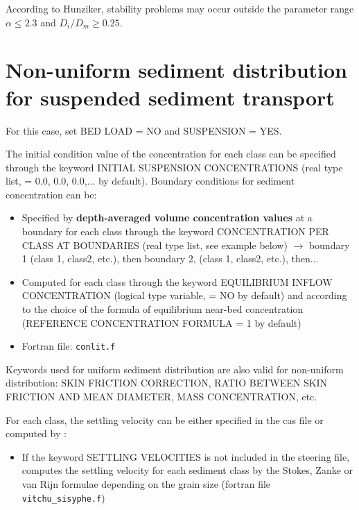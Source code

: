 According to Hunziker, stability problems may occur outside the parameter range $\alpha \leq 2.3$ and $D_i/D_m \geq 0.25$.


\section{Non-uniform sediment distribution for suspended sediment transport}
For this case, set {\ttfamily BED LOAD = NO} and {\ttfamily SUSPENSION = YES}.

The initial condition value of the concentration for each class can be specified through the keyword {\ttfamily INITIAL SUSPENSION CONCENTRATIONS} (real type list, {\ttfamily = 0.0, 0.0, 0.0,...} by default). Boundary conditions for sediment concentration can be:
\begin{itemize}
\item Specified by \textbf{depth-averaged volume concentration values} at a boundary for each class through the keyword {\ttfamily CONCENTRATION PER CLASS AT BOUNDARIES} (real type list, see example below) $\rightarrow$ boundary 1 (class 1, class2, etc.), then boundary 2, (class 1, class2, etc.), then...
\item Computed for each class through the keyword {\ttfamily EQUILIBRIUM INFLOW CONCENTRATION} (logical type variable, {\ttfamily = NO} by default) and according to the choice of the formula of equilibrium near-bed concentration ({\ttfamily REFERENCE CONCENTRATION FORMULA = 1} by default) 
\item Fortran file: \texttt{conlit.f}
\end{itemize}

Keywords used for uniform sediment distribution are also valid for non-uniform distribution: {\ttfamily SKIN FRICTION CORRECTION}, {\ttfamily RATIO BETWEEN SKIN FRICTION AND MEAN DIAMETER}, {\ttfamily MASS CONCENTRATION}, etc.

For each class, the settling velocity can be either specified in the cas file or computed by \sisyphe{}:
\begin{itemize}
\item If the keyword {\ttfamily SETTLING VELOCITIES} is not included in the steering file, \sisyphe{} computes the settling velocity for each sediment class by the Stokes, Zanke or van Rijn formulae depending on the grain size (fortran file \texttt{vitchu\_sisyphe.f})
\end{itemize}

